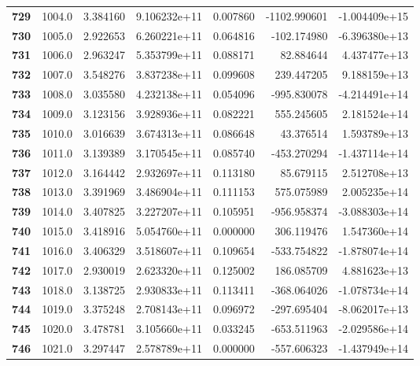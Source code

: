 \documentclass{report}[12pt]
\begin{document}
\begin{center}
\begin{tabular}{lrrrrrr}
\textbf{729 } &         1004.0 &   3.384160 &  9.106232e+11 &    0.007860 & -1102.990601 & -1.004409e+15 \\
\textbf{730 } &         1005.0 &   2.922653 &  6.260221e+11 &    0.064816 &  -102.174980 & -6.396380e+13 \\
\textbf{731 } &         1006.0 &   2.963247 &  5.353799e+11 &    0.088171 &    82.884644 &  4.437477e+13 \\
\textbf{732 } &         1007.0 &   3.548276 &  3.837238e+11 &    0.099608 &   239.447205 &  9.188159e+13 \\
\textbf{733 } &         1008.0 &   3.035580 &  4.232138e+11 &    0.054096 &  -995.830078 & -4.214491e+14 \\
\textbf{734 } &         1009.0 &   3.123156 &  3.928936e+11 &    0.082221 &   555.245605 &  2.181524e+14 \\
\textbf{735 } &         1010.0 &   3.016639 &  3.674313e+11 &    0.086648 &    43.376514 &  1.593789e+13 \\
\textbf{736 } &         1011.0 &   3.139389 &  3.170545e+11 &    0.085740 &  -453.270294 & -1.437114e+14 \\
\textbf{737 } &         1012.0 &   3.164442 &  2.932697e+11 &    0.113180 &    85.679115 &  2.512708e+13 \\
\textbf{738 } &         1013.0 &   3.391969 &  3.486904e+11 &    0.111153 &   575.075989 &  2.005235e+14 \\
\textbf{739 } &         1014.0 &   3.407825 &  3.227207e+11 &    0.105951 &  -956.958374 & -3.088303e+14 \\
\textbf{740 } &         1015.0 &   3.418916 &  5.054760e+11 &    0.000000 &   306.119476 &  1.547360e+14 \\
\textbf{741 } &         1016.0 &   3.406329 &  3.518607e+11 &    0.109654 &  -533.754822 & -1.878074e+14 \\
\textbf{742 } &         1017.0 &   2.930019 &  2.623320e+11 &    0.125002 &   186.085709 &  4.881623e+13 \\
\textbf{743 } &         1018.0 &   3.138725 &  2.930833e+11 &    0.113411 &  -368.064026 & -1.078734e+14 \\
\textbf{744 } &         1019.0 &   3.375248 &  2.708143e+11 &    0.096972 &  -297.695404 & -8.062017e+13 \\
\textbf{745 } &         1020.0 &   3.478781 &  3.105660e+11 &    0.033245 &  -653.511963 & -2.029586e+14 \\
\textbf{746 } &         1021.0 &   3.297447 &  2.578789e+11 &    0.000000 &  -557.606323 & -1.437949e+14 \\

\end{tabular}
\end{center}
\end{document}
